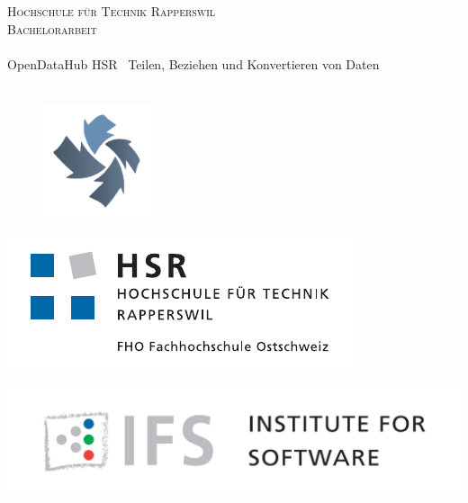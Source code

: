 
\author{
	\rlif \\
	\and
	\chuf \\
	\and
	\fscf \\
}

\clearpage
\begin{titlepage}
	
	\begin{center}
		\textsc{Hochschule für Technik Rapperswil} \\
		\textsc{Bachelorarbeit} \\ [25pt]
		\hr{0.5pt} \\[0.4cm]
		\huge OpenDataHub HSR \textendash\ Teilen, Beziehen und Konvertieren von Daten \\
		\hr{2pt} \\[0.5cm]
		
		\begin{figure}[H]
			\centering
			\includegraphics[width=0.3\textwidth]{fig/opendatahub-logo}
		\end{figure}
		
		\begin{minipage}{0.49\textwidth}
			\includegraphics[width=\textwidth]{fig/hsr-logo}
		\end{minipage}
		\begin{minipage}{0.49\textwidth}
			\includegraphics[width=\textwidth]{fig/ifs-logo}
		\end{minipage}
		

\end{center}
\end{titlepage}
